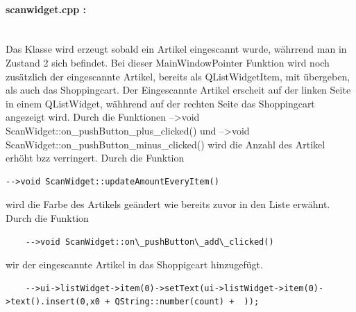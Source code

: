 \documentclass[11pt,a4paper]{article} %
\begin{document}
\paragraph{scanwidget.cpp :} $\;$ \\
	Das Klasse wird erzeugt sobald ein Artikel eingescannt wurde, währrend man in Zustand 2 sich befindet.
	Bei dieser MainWindowPointer Funktion wird noch zusätzlich der eingescannte Artikel, bereits als QListWidgetItem, mit übergeben, als auch das Shoppingcart.
	Der Eingescannte Artikel erscheit auf der linken Seite in einem QListWidget, wähhrend auf der rechten Seite das Shoppingcart angezeigt wird.
	Durch die Funktionen -->void ScanWidget::on\_pushButton\_plus\_clicked() und -->void ScanWidget::on\_pushButton\_minus\_clicked() wird die Anzahl des Artikel erhöht bzz verringert.
	Durch die Funktion 
	\begin{frame}

\begin{lstlisting}
-->void ScanWidget::updateAmountEveryItem()
\end{lstlisting}
\end{frame}
wird die Farbe des Artikels geändert wie bereits zuvor in den Liste erwähnt.
	Durch die Funktion 
	\begin{frame}

\begin{lstlisting}
	-->void ScanWidget::on\_pushButton\_add\_clicked()
	\end{lstlisting}
\end{frame}
	  wir der eingescannte Artikel in das Shoppigcart hinzugefügt.
	\begin{frame}

\begin{lstlisting}
	-->ui->listWidget->item(0)->setText(ui->listWidget->item(0)->text().insert(0,x0 + QString::number(count) +  ));	
	\end{lstlisting}
\end{frame}
\par		
\end{document}
